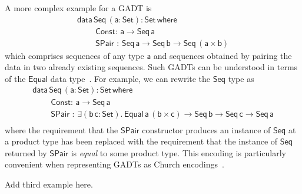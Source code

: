 \documentclass[acmsmall,screen,review,anonymous]{acmart}
\theoremstyle{definition}
\begin{document}
A more complex example for a GADT is
\begin{equation}\label{eq:eq-seq}
\begin{array}{l}
\mathsf{data\, Seq\,(a : Set) : Set\,where}\\
\mathsf{\;\;\;\;\;\;\;\;Const :\, a \to Seq\,a}\\
\mathsf{\;\;\;\;\;\;\;\;SPair\,\, :\, Seq \,a \to Seq\,b \to
  Seq\,(a \times b)}
\end{array}
\end{equation}
which comprises sequences of any type $\mathsf{a}$
and sequences obtained by pairing the data in two already existing sequences.
Such GADTs can be understood in terms of the $\mathsf{Equal}$ data type~\cite{ch03,sp04}.
For example, we can rewrite the $\mathsf{Seq}$ type as
\begin{equation}\label{eq:eq_seq}
\begin{array}{l}
\mathsf{data\, Seq\,(a : Set) : Set\,where}\\
\mathsf{\;\;\;\;\;\;\;\;Const :\, a \to Seq\,a}\\
\mathsf{\;\;\;\;\;\;\;\;SPair\,\, :\, \exists (b\,c : Set).\,Equal\,a\,(b \times c) \to Seq\,b \to Seq\,c \to
  Seq\,a}\\ 
\end{array}
\end{equation}
where the requirement that the $\mathsf{SPair}$ constructor produces an instance of $\mathsf{Seq}$ at a product type has been replaced with the requirement that the instance of $\mathsf{Seq}$ returned by $\mathsf{SPair}$ is \emph{equal} to some product type.
This encoding is particularly convenient when representing GADTs as Church encodings~\cite{vw10,atk12}.

{\color{red} Add third example here.}



\end{document}
